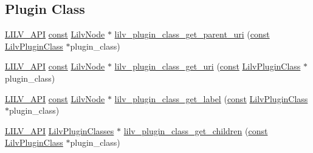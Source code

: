 \subsection*{Plugin Class}
\begin{DoxyCompactItemize}
\item 
\hyperlink{lilv_8h_aa5182eee7ddff96862d0171967ee6f77}{L\+I\+L\+V\+\_\+\+A\+PI} \hyperlink{getopt1_8c_a2c212835823e3c54a8ab6d95c652660e}{const} \hyperlink{lilv_8h_ae183dca3dca5368d34dbd863a405437b}{Lilv\+Node} $\ast$ \hyperlink{group__lilv_ga01f07e0a32914844dae78c0bd3e8d036}{lilv\+\_\+plugin\+\_\+class\+\_\+get\+\_\+parent\+\_\+uri} (\hyperlink{getopt1_8c_a2c212835823e3c54a8ab6d95c652660e}{const} \hyperlink{lilv_8h_a94da06d43a4f980af280b9d8bf4ae1f0}{Lilv\+Plugin\+Class} $\ast$plugin\+\_\+class)
\item 
\hyperlink{lilv_8h_aa5182eee7ddff96862d0171967ee6f77}{L\+I\+L\+V\+\_\+\+A\+PI} \hyperlink{getopt1_8c_a2c212835823e3c54a8ab6d95c652660e}{const} \hyperlink{lilv_8h_ae183dca3dca5368d34dbd863a405437b}{Lilv\+Node} $\ast$ \hyperlink{group__lilv_ga06cd3c02c5276d78797d3782fc952cca}{lilv\+\_\+plugin\+\_\+class\+\_\+get\+\_\+uri} (\hyperlink{getopt1_8c_a2c212835823e3c54a8ab6d95c652660e}{const} \hyperlink{lilv_8h_a94da06d43a4f980af280b9d8bf4ae1f0}{Lilv\+Plugin\+Class} $\ast$plugin\+\_\+class)
\item 
\hyperlink{lilv_8h_aa5182eee7ddff96862d0171967ee6f77}{L\+I\+L\+V\+\_\+\+A\+PI} \hyperlink{getopt1_8c_a2c212835823e3c54a8ab6d95c652660e}{const} \hyperlink{lilv_8h_ae183dca3dca5368d34dbd863a405437b}{Lilv\+Node} $\ast$ \hyperlink{group__lilv_gab9655154e2edcd72ad1d244767e444b9}{lilv\+\_\+plugin\+\_\+class\+\_\+get\+\_\+label} (\hyperlink{getopt1_8c_a2c212835823e3c54a8ab6d95c652660e}{const} \hyperlink{lilv_8h_a94da06d43a4f980af280b9d8bf4ae1f0}{Lilv\+Plugin\+Class} $\ast$plugin\+\_\+class)
\item 
\hyperlink{lilv_8h_aa5182eee7ddff96862d0171967ee6f77}{L\+I\+L\+V\+\_\+\+A\+PI} \hyperlink{lilv_8h_a1ef5389c0a24cb8e0adcf971d2d12f0e}{Lilv\+Plugin\+Classes} $\ast$ \hyperlink{group__lilv_gac9165a547996dc5637086190c78283a6}{lilv\+\_\+plugin\+\_\+class\+\_\+get\+\_\+children} (\hyperlink{getopt1_8c_a2c212835823e3c54a8ab6d95c652660e}{const} \hyperlink{lilv_8h_a94da06d43a4f980af280b9d8bf4ae1f0}{Lilv\+Plugin\+Class} $\ast$plugin\+\_\+class)
\end{DoxyCompactItemize}
